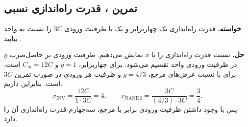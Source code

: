 \subsection{تمرین ، قدرت راه‌اندازی نسبی}
\label{sec:delay-exercise-drive}

\textbf{خواسته.}
قدرت راه‌اندازی یک  چهاربرابر و یک
 با ظرفیت ورودی \(3C\) را نسبت به
 واحد بیابید
\cite[تمرین ، صفحه ۱۷۷]{weste}.

\textbf{حل.}
نسبت قدرت راه‌اندازی را با \(x\) نمایش می‌دهیم.
ظرفیت ورودی بر حاصل‌ضرب \(g\)
در ظرفیت ورودی  واحد تقسیم می‌شود. برای
 چهاربرابر، \(g=1\) و \(C_{\mathrm{in}}=12C\)
است. برای  با نسبت عرض‌های مرجع، \(g=4/3\)
و ظرفیت هر ورودی در صورت تمرین \(3C\) است. بنابراین داریم.
\[
  x_{\mathrm{INV}}=\frac{12C}{1\cdot3C}=4,
  \qquad
  x_{\mathrm{NAND2}}=\frac{3C}{(4/3)\cdot3C}=\frac34.
\]
پس  با وجود داشتن ظرفیت ورودی برابر با مرجع،
سه‌چهارم قدرت راه‌اندازی آن را دارد.

